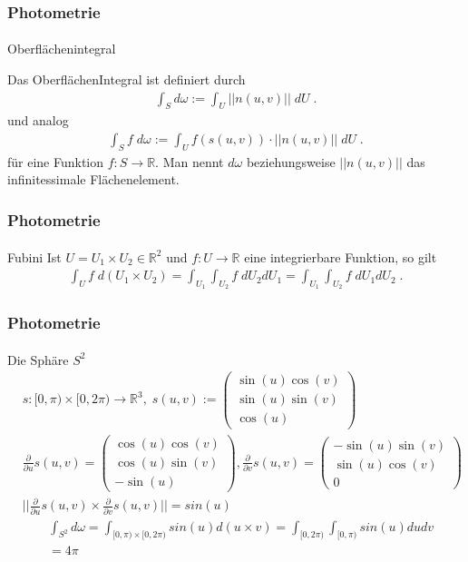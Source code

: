 \documentclass{beamer}
\begin{document}
\begin{frame}
    \frametitle{Photometrie}
\framesubtitle{}
\begin{block}{Oberflächenintegral}

Das OberflächenIntegral ist definiert durch
\begin{align*}
\int_S d \omega:= \int_U ||n(u,v)|| \; dU \;.
\end{align*} 
und  analog
\begin{align*}
\int_S f \;  d \omega:= \int_U f(s(u,v)) \cdot ||n(u,v)|| \; dU \;.
\end{align*} 
für eine Funktion $f: S \to \mathbb{R}$.
Man nennt $d \omega$ beziehungsweise $ ||n(u,v)||$ das infinitessimale Flächenelement.
\end{block}
\end{frame}

\begin{frame}
    \frametitle{Photometrie}
\framesubtitle{}
\begin{block}{Fubini}
Ist $U = U_1 \times U_2 \in \mathbb{R}^2$ und $f: U \to \mathbb{R}$ eine integrierbare Funktion, so gilt
\begin{align*}
\int_U f \; d(U_1 \times U_2) = \int_{U_1} \int_{U_2} f  \;  dU_2 dU_1   = \int_{U_1} \int_{U_2} f  \;  dU_1 dU_2 \;.
\end{align*} 
\end{block}
\end{frame}


\begin{frame}
    \frametitle{Photometrie}
\framesubtitle{}
\begin{block}{Die  Sphäre $S^2$}
\begin{align*}
& s:  [0, \pi) \times  [0, 2 \pi)  \to \mathbb{R}^3 , \;
  s(u,v) :=  
 \begin{pmatrix}  \sin(u) \cos(v) \\   \sin(u) \sin(v) \\   \cos(u)  \end{pmatrix} \\
& \frac{\partial}{\partial u} s(u,v) =  \begin{pmatrix}  \cos(u) \cos(v) \\   \cos(u) \sin(v) \\   -\sin(u)  \end{pmatrix} , 
\frac{\partial}{\partial v} s(u,v) =  \begin{pmatrix}  -\sin(u) \sin(v) \\   \sin(u) \cos(v) \\   0  \end{pmatrix} \\
& ||\frac{\partial}{\partial u} s(u,v) \times \frac{\partial}{\partial v} s(u,v) || = sin(u)
\end{align*} 
\begin{align*}
& \int_{S^2} d\omega  = \int_{[0, \pi) \times  [0, 2 \pi) } sin(u) d(u \times v) =   \int_{[0, 2 \pi) }   \int_{[0, \pi) } sin(u) du dv \\ 
& = 4 \pi
\end{align*} 

\end{block}
\end{frame}
\end{document}
